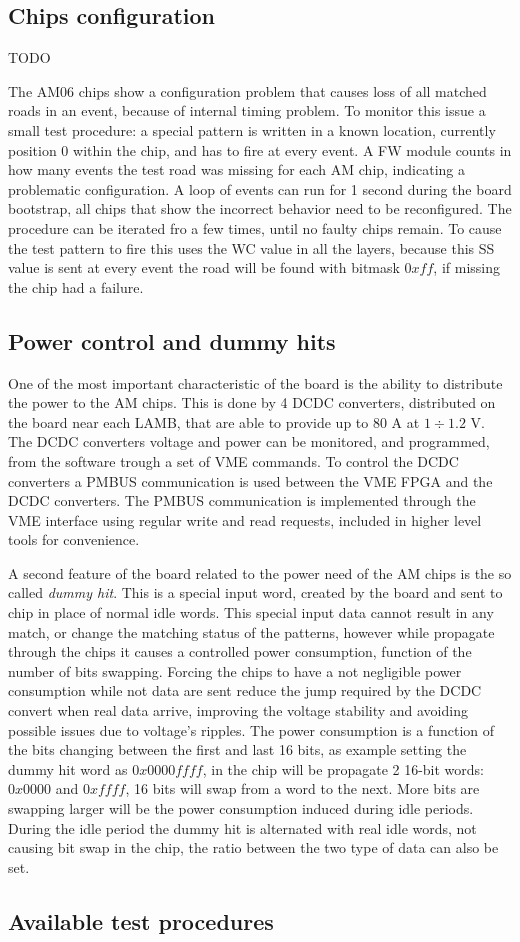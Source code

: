 \subsection{Chips configuration}
\label{sec:chipconfig}
 TODO
 
The AM06 chips show a configuration problem that causes loss of all matched
roads in an event, because of internal timing problem. To monitor this issue a
small test procedure: a special pattern is written in a known location, currently
position 0 within the chip, and has to fire at every event. A FW module counts in
how many events the test road was missing for each AM chip, indicating a problematic
configuration.
A loop of events can run for 1 second during the board 
bootstrap, all chips that show the incorrect behavior need to be reconfigured.
The procedure can be iterated fro a few times, until no faulty chips remain.
To cause the test pattern to fire this uses the WC value in all the layers,
because this SS value is sent at every event the road will be found with bitmask
$0xff$, if missing the chip had a failure.
 
\subsection{Power control and dummy hits}
\label{sec:powercontrol}

One of the most important characteristic of the board is the ability to distribute
the power to the AM chips. This is done by 4 DCDC converters, distributed on the
board near each LAMB, that are able to provide up to 80 A at $1\div1.2$ V. The
DCDC converters voltage and power can be monitored, and programmed, from the software
trough a set of VME commands.
To control the DCDC converters a PMBUS communication is used between the VME
FPGA and the DCDC converters. The PMBUS communication is implemented through the
VME interface using regular write and read requests, included in higher
level tools for convenience.

A second feature of the board related to the power need of the AM chips is
the so called \emph{dummy hit}. This is a special input word, created by the board
and sent to chip in place of normal idle words. This special input data cannot 
result in any match, or change the matching status of the patterns, however while
propagate through the chips it causes a controlled power consumption, function of
the number of bits swapping. Forcing the chips to have a not negligible power
consumption while not data are sent reduce the jump required by the DCDC convert
when real data arrive, improving the voltage stability and avoiding possible
issues due to voltage's ripples. The power consumption is a function of the 
bits changing between the first and last 16 bits, as example setting the dummy 
hit word as $0x0000ffff$, in the chip will be propagate 2 16-bit words: $0x0000$
and $0xffff$, 16 bits will swap from a word to the next. 
More bits are swapping larger will be the  power consumption induced during idle
periods. During the idle period the dummy hit is alternated with real idle words,
not causing bit swap in the chip, the ratio between the two type of data can also be
set.

\subsection{Available test procedures}
